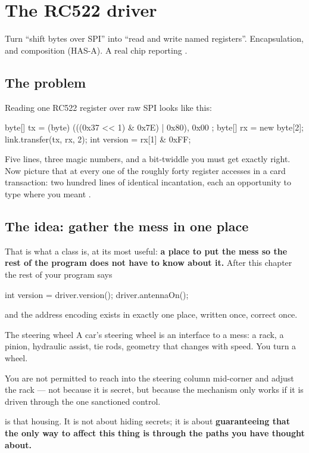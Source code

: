 \chapter{The RC522 driver}
\label{ch:driver}

\chapterbrief
  {Turn ``shift bytes over SPI'' into ``read and write named registers''.}
  {Encapsulation, and composition (HAS-A).}
  {A real chip reporting .}

\section{The problem}

Reading one RC522 register over raw SPI looks like this:

\begin{jcode}
byte[] tx = { (byte) (((0x37 << 1) & 0x7E) | 0x80), 0x00 };
byte[] rx = new byte[2];
link.transfer(tx, rx, 2);
int version = rx[1] & 0xFF;
\end{jcode}

Five lines, three magic numbers, and a bit-twiddle you must get exactly right.
Now picture that at every one of the roughly forty register accesses in a card
transaction: two hundred lines of identical incantation, each an opportunity to
type  where you meant .

\section{The idea: gather the mess in one place}

That is what a class is, at its most useful: \textbf{a place to put the mess so
the rest of the program does not have to know about it.} After this chapter the
rest of your program says

\begin{jcode}
int version = driver.version();
driver.antennaOn();
\end{jcode}

and the address encoding exists in exactly one place, written once, correct once.

\begin{analogy}{The steering wheel}
A car's steering wheel is an interface to a mess: a rack, a pinion, hydraulic
assist, tie rods, geometry that changes with speed. You turn a wheel.

You are not permitted to reach into the steering column mid-corner and adjust
the rack --- not because it is secret, but because the mechanism only works if it
is driven through the one sanctioned control.

 is that housing. It is not about hiding secrets; it is about
\textbf{guaranteeing that the only way to affect this thing is through the paths
you have thought about.}
\end{analogy}


